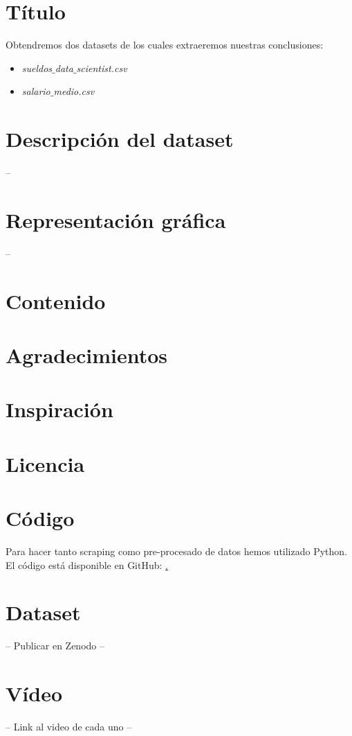 \documentclass[IB]{PlantillaPACnova_Est}
\begin{document}
\section{Título}

Obtendremos dos datasets de los cuales extraeremos nuestras conclusiones: 
\begin{itemize}
\item \textit{sueldos$\_$data$\_$scientist.csv}
\item \textit{salario$\_$medio.csv}
\end{itemize}

\section{Descripción del dataset}

--

\section{Representación gráfica}


--


\section{Contenido}



\section{Agradecimientos}



\section{Inspiración}


\section{Licencia}


\section{Código}

Para hacer tanto scraping como pre-procesado de datos hemos utilizado Python. El código está disponible en GitHub: \href{https://github.com/mdmoyano/web_scraping}.

\section{Dataset}

-- Publicar en Zenodo --

\section{Vídeo}

-- Link al video de cada uno --



%
%
\newpage

 
\end{document}
